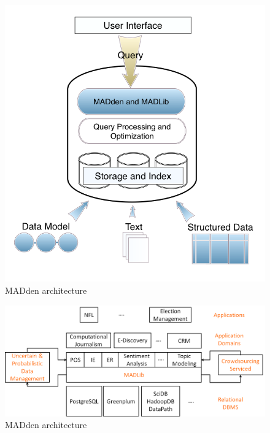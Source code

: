 \documentclass{article}
\newcommand{\system}{MADden\xspace}
\begin{document}
\begin{enumerate}
  \begin{figure}
    \begin{center}
      \includegraphics[scale=0.4]{arch.png}
      \caption{{\system} architecture}
      \label{fig:arch}
    \end{center}
  \end{figure}


  \begin{figure}
    \begin{center}
      \includegraphics[scale=0.3]{altachitecture.png}
      \caption{{\system} architecture}
      \label{fig:altarch}
    \end{center}
  \end{figure}



\end{enumerate}
\end{document}
